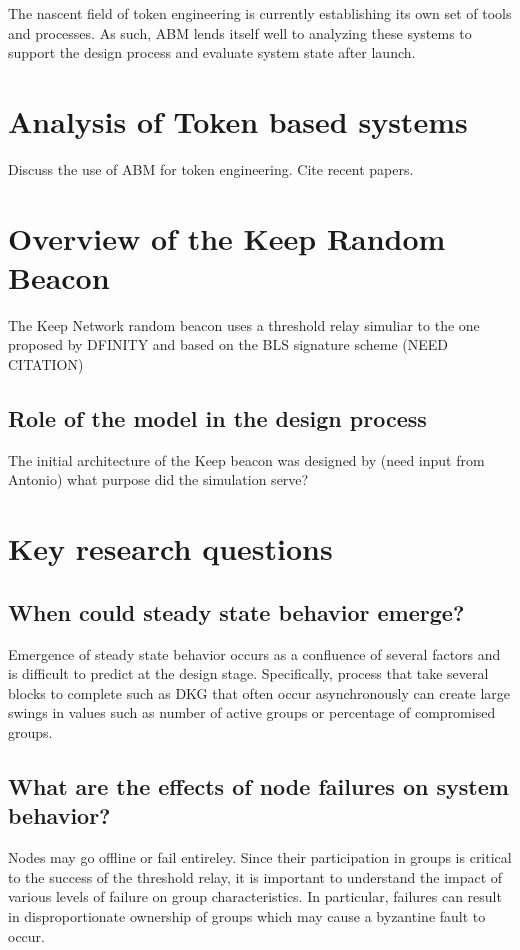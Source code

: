 \documentclass[conference]{IEEEtran}
\begin{document}
The nascent field of token engineering is currently establishing its own set 
of tools and processes. As such, ABM lends itself well to analyzing these systems
to support the design process and evaluate system state after launch.

\section{Analysis of Token based systems}


Discuss the use of ABM for token engineering. Cite recent papers.

\section{Overview of the Keep Random Beacon}
The Keep Network random beacon uses a threshold relay simuliar to the one proposed
by DFINITY and based on the BLS signature scheme \cite{} (NEED CITATION)

\subsection{Role of the model in the design process}
The initial architecture of the Keep beacon was designed by (need input from Antonio)
what purpose did the simulation serve?

\section{Key research questions}
\subsection{When could steady state behavior emerge?}
Emergence of steady state behavior occurs as a confluence of several factors and is difficult
to predict at the design stage. Specifically, process that take several blocks to complete 
such as DKG that often occur asynchronously can create large swings in values such as number of active
groups or percentage of compromised groups. 

\subsection{What are the effects of node failures on system behavior?}
Nodes may go offline or fail entireley. Since their participation in groups is critical to the 
success of the threshold relay, it is important to understand the impact of various levels
of failure on group characteristics. In particular, failures can result in disproportionate ownership
of groups which may cause a byzantine fault to occur. 
\end{document}
